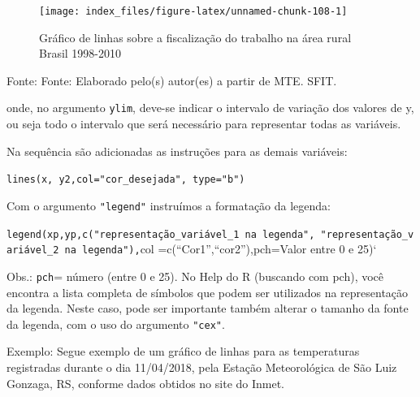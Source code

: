 \documentclass[12pt,brazil,oneside]{book}
\newenvironment{Shaded}{\begin{snugshade}}{\end{snugshade}}
\newcommand{\DataTypeTok}[1]{\textcolor[rgb]{0.13,0.29,0.53}{#1}}
\newcommand{\KeywordTok}[1]{\textcolor[rgb]{0.13,0.29,0.53}{\textbf{#1}}}
\newcommand{\NormalTok}[1]{#1}
\newcommand{\OtherTok}[1]{\textcolor[rgb]{0.56,0.35,0.01}{#1}}
\newcommand{\StringTok}[1]{\textcolor[rgb]{0.31,0.60,0.02}{#1}}
\begin{document}
\begin{figure}[H]

{\centering \texttt{[image: index\_files/figure-latex/unnamed-chunk-108-1]} 

}

\caption{Gráfico de linhas sobre a fiscalização do trabalho na área rural Brasil 1998-2010}\label{fig:unnamed-chunk-108}
\end{figure}

Fonte: Fonte: Elaborado pelo(s) autor(es) a partir de MTE. SFIT.

onde, no argumento \texttt{ylim}, deve-se indicar o intervalo de variação dos valores de y, ou seja todo o intervalo que será necessário para representar todas as variáveis.

Na sequência são adicionadas as instruções para as demais variáveis:

\texttt{lines(x,\ y2,col="cor\_desejada",\ type="b")}

Com o argumento \texttt{"legend"} instruímos a formatação da legenda:

\texttt{legend(xp,yp,c("representação\_variável\_1\ na\ legenda",\ "representação\_variável\_2\ na\ legenda"),}col =c(``Cor1'',``cor2''),pch=Valor entre 0 e 25)`

Obs.: \texttt{pch}= número (entre 0 e 25). No Help do R (buscando com pch), você encontra a lista completa de símbolos que podem ser utilizados na representação da legenda.
Neste caso, pode ser importante também alterar o tamanho da fonte da legenda, com o uso do argumento \texttt{"cex"}.

Exemplo: Segue exemplo de um gráfico de linhas para as temperaturas registradas durante o dia 11/04/2018, pela Estação Meteorológica de São Luiz Gonzaga, RS, conforme dados obtidos no site do Inmet.

\begin{Shaded}
\end{Shaded}
\end{document}
